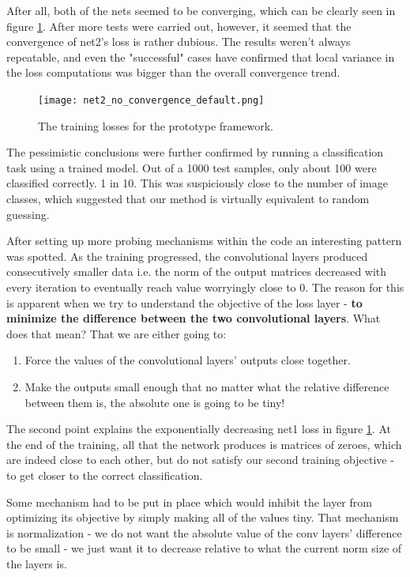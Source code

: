 \documentclass[a4paper, 12pt]{article}
\numberwithin{equation}{section}
\begin{document}
	After all, both of the nets seemed to be converging, which can be clearly seen in figure \ref{fig:net2_no_convergence_default}. After more tests were carried out, however, it seemed that the convergence of net2's loss is rather dubious. The results weren't always repeatable, and even the "successful" cases have confirmed that local variance in the loss computations was bigger than the overall convergence trend.

	\begin{figure}[!h]
		\centering
		\texttt{[image: net2\_no\_convergence\_default.png]}
		\caption{\label{fig:net2_no_convergence_default}{The training losses for the prototype framework.}}
	\end{figure}

	The pessimistic conclusions were further confirmed by running a classification task using a trained model. Out of a 1000 test samples, only about 100 were classified correctly. 1 in 10. This was suspiciously close to the number of image classes, which suggested that our method is virtually equivalent to random guessing.

	After setting up more probing mechanisms within the code an interesting pattern was spotted. As the training progressed, the convolutional layers produced consecutively smaller data i.e. the norm of the output matrices decreased with every iteration to eventually reach value worryingly close to 0. The reason for this is apparent when we try to understand the objective of the loss layer - \textbf{to minimize the difference between the two convolutional layers}. What does that mean? That we are either going to:
	\begin{enumerate}
		\item Force the values of the convolutional layers' outputs close together.
		\item Make the outputs small enough that no matter what the relative difference between them is, the absolute one is going to be tiny!
	\end{enumerate}

	The second point explains the exponentially decreasing net1 loss in figure \ref{fig:net2_no_convergence_default}. At the end of the training, all that the network produces is matrices of zeroes, which are indeed close to each other, but do not satisfy our second training objective - to get closer to the correct classification.

	Some mechanism had to be put in place which would inhibit the layer from optimizing its objective by simply making all of the values tiny. That mechanism is normalization - we do not want the absolute value of the conv layers' difference to be small - we just want it to decrease relative to what the current norm size of the layers is.
\end{document}
